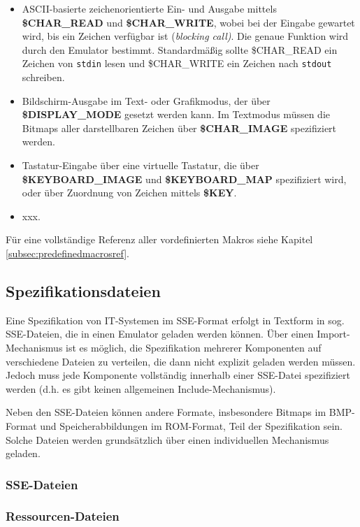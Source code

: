 \documentclass{scrartcl}
\begin{document}
\begin{itemize}
	\item ASCII-basierte zeichenorientierte Ein- und Ausgabe mittels \textbf{\$CHAR\_READ} und \textbf{\$CHAR\_WRITE}, wobei bei der Eingabe gewartet wird, bis ein Zeichen verfügbar ist (\textit{blocking call)}. Die genaue Funktion wird durch den Emulator bestimmt. Standardmäßig sollte \$CHAR\_READ ein Zeichen von \texttt{stdin} lesen und \$CHAR\_WRITE ein Zeichen nach \texttt{stdout} schreiben.
	\item Bildschirm-Ausgabe im Text- oder Grafikmodus, der über \textbf{\$DISPLAY\_MODE} gesetzt werden kann. Im Textmodus müssen die Bitmaps aller darstellbaren Zeichen über \textbf{\$CHAR\_IMAGE} spezifiziert werden.
	\item Tastatur-Eingabe über eine virtuelle Tastatur, die über \textbf{\$KEYBOARD\_IMAGE} und \textbf{\$KEYBOARD\_MAP} spezifiziert wird, oder über Zuordnung von Zeichen mittels \textbf{\$KEY}.
	\item xxx.
\end{itemize}

\noindent Für eine vollständige Referenz aller vordefinierten Makros siehe Kapitel \ref{subsec:predefinedmacrosref}.

\subsection{Spezifikationsdateien}

\noindent Eine Spezifikation von IT-Systemen im SSE-Format erfolgt in Textform in sog. SSE-Dateien, die in einen Emulator geladen werden können. Über einen Import-Mechanismus ist es möglich, die Spezifikation mehrerer Komponenten auf verschiedene Dateien zu verteilen, die dann nicht explizit geladen werden müssen. Jedoch muss jede Komponente vollständig innerhalb einer SSE-Datei spezifiziert werden (d.h. es gibt keinen allgemeinen Include-Mechanismus).

\vspace{10pt}
\noindent Neben den SSE-Dateien können andere Formate, insbesondere Bitmaps im BMP-Format und Speicherabbildungen im ROM-Format, Teil der Spezifikation sein. Solche Dateien werden grundsätzlich über einen individuellen Mechanismus geladen.

\subsubsection{SSE-Dateien}

\subsubsection{Ressourcen-Dateien}
\end{document}
